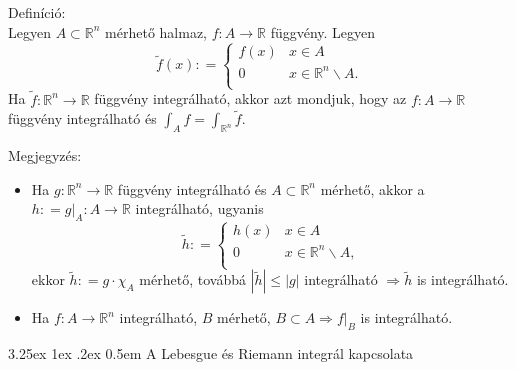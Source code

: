 \documentclass[12pt,a4paper]{scrartcl}
\makeatletter
\renewcommand\paragraph{\@startsection{paragraph}{4}{\z@}%
                                    {3.25ex \@plus1ex \@minus.2ex}%
                                    {0.5em} %
                                    {\normalfont\normalsize\bfseries}}
\providecommand{\tightlist}{%
  \setlength{\itemsep}{0pt}\setlength{\parskip}{0pt}}
\newenvironment{definicio}{}{}
\newenvironment{megjegyzes}{}{}
\makeatother
\begin{document}
\begin{definicio}

Definíció:\\
Legyen \(A \subset {\mathbb{R}}^{n}\) mérhető halmaz,
\(\left. f:A\rightarrow{\mathbb{R}} \right.\) függvény. Legyen
\[\widetilde{f}\left( x \right): = \left\{ \begin{matrix}
{f\left( x \right)} & {x \in A} \\
0 & {x \in {\mathbb{R}}^{n}\backslash A.} \\
\end{matrix} \right.\] Ha
\(\left. \widetilde{f}:{\mathbb{R}}^{n}\rightarrow{\mathbb{R}} \right.\)
függvény integrálható, akkor azt mondjuk, hogy az
\(\left. f:A\rightarrow{\mathbb{R}} \right.\) függvény integrálható és
\({\int_{A}f} = {\int_{{\mathbb{R}}^{n}}\widetilde{f}}\).

\end{definicio}

\begin{megjegyzes}

Megjegyzés:

\begin{itemize}
\tightlist
\item
  Ha \(\left. g:{\mathbb{R}}^{n}\rightarrow{\mathbb{R}} \right.\)
  függvény integrálható és \(A \subset {\mathbb{R}}^{n}\) mérhető, akkor
  a
  \(\left. h: = \left. g \right|_{A}:A\rightarrow{\mathbb{R}} \right.\)
  integrálható, ugyanis \[\widetilde{h}: = \left\{ \begin{matrix}
  {h\left( x \right)} & {x \in A} \\
  0 & {x \in {\mathbb{R}}^{n}\backslash A,} \\
  \end{matrix} \right.\] ekkor \(\widetilde{h}: = g \cdot \chi_{A}\)
  mérhető, továbbá
  \(\left| \widetilde{h} \right| \leq \left| g \right|\) integrálható
  \(\left. \Rightarrow\widetilde{h} \right.\) is integrálható.
\item
  Ha \(\left. f:A\rightarrow{\mathbb{R}}^{n} \right.\) integrálható,
  \(B\) mérhető,
  \(\left. B \subset A\Rightarrow\left. f \right|_{B} \right.\) is
  integrálható.
\end{itemize}

\end{megjegyzes}

\hypertarget{a-lebesgue-es-riemann-integral-kapcsolata}{%
\paragraph{A Lebesgue és Riemann integrál
kapcsolata}\label{a-lebesgue-es-riemann-integral-kapcsolata}}
\end{document}
